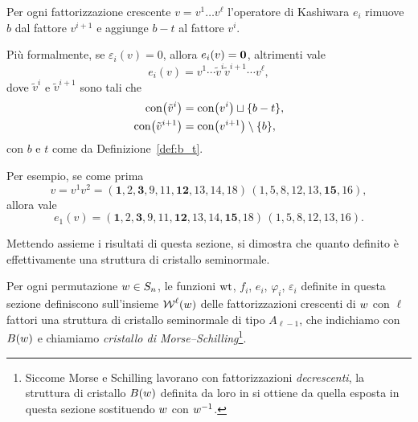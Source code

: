 \begin{definition}
    Per ogni fattorizzazione crescente $v = v^1 \dots v^\ell$ l'operatore di Kashiwara
    $e_i$ rimuove $b$ dal fattore $v^{i+1}$ e aggiunge $b-t$ al fattore $v^i$.

    Pi\`u formalmente, se $\varepsilon_i(v) = 0$, allora $e_i (v) = \mathbf{0}$, 
    altrimenti vale 
    \[
        e_i (v) = v^1 \cdots \tilde{v}^i \tilde{v}^{i+1} \cdots v^\ell,
    \]
    dove $\tilde{v}^i$ e $ \tilde{v}^{i+1} $ sono tali che 
    \begin{align*}
        \operatorname{con} \bigl( \tilde{v}^i \bigr) &= \operatorname{con} \bigl(v^i\bigr) \sqcup \{ b -t \}, \\
        \operatorname{con} \bigl( \tilde{v}^{i+1}\bigr) &= \operatorname{con} \bigl(v^{i+1}\bigr) \setminus \{ b \},
    \end{align*}
    con $b$ e $t$ come da Definizione~\ref{def:b_t}.
\end{definition}

\begin{example}
    Per esempio, se come prima
    \[
        v = v^1  v^2 = 
        ( \mathbf{1}, 2, \mathbf{3}, 9, 11, \mathbf{12}, 13, 14, 18 ) \,
        ( 1, 5, 8, 12, 13, \mathbf{15}, 16),
    \]
    allora vale
    \[
        e_1(v) = 
        ( \mathbf{1}, 2, \mathbf{3}, 9, 11, \mathbf{12}, 13, 14, \mathbf{15}, 18 ) \,
        ( 1, 5, 8, 12, 13, 16).
    \]
\end{example}

    
Mettendo assieme i risultati di questa sezione, si dimostra che 
quanto definito  \`e effettivamente una struttura di cristallo 
seminormale.


\begin{definition}
    Per ogni permutazione $w \in S_n$,
    le funzioni $\operatorname{wt}$, $f_i$, $e_i$, $\varphi_i$, $\varepsilon_i$ definite in questa
    sezione definiscono sull'insieme $\operatorname{\mathcal{W}} ^\ell ( w )$
    delle fattorizzazioni crescenti di $w$ con $\ell$ fattori
    una struttura di cristallo seminormale
    di tipo $A_{\ell-1}$, che indichiamo con $B(w)$ e chiamiamo
    \emph{cristallo di Morse--Schilling}\footnote{
        Siccome Morse e Schilling 
        lavorano con fattorizzazioni \emph{decrescenti}, la struttura di cristallo
        $B(w)$ definita da loro in \cite[Section~3]{morse-schilling-15}
        si ottiene da quella esposta in questa sezione sostituendo $w$ con $w^{-1}$.
    }.
\end{definition}

